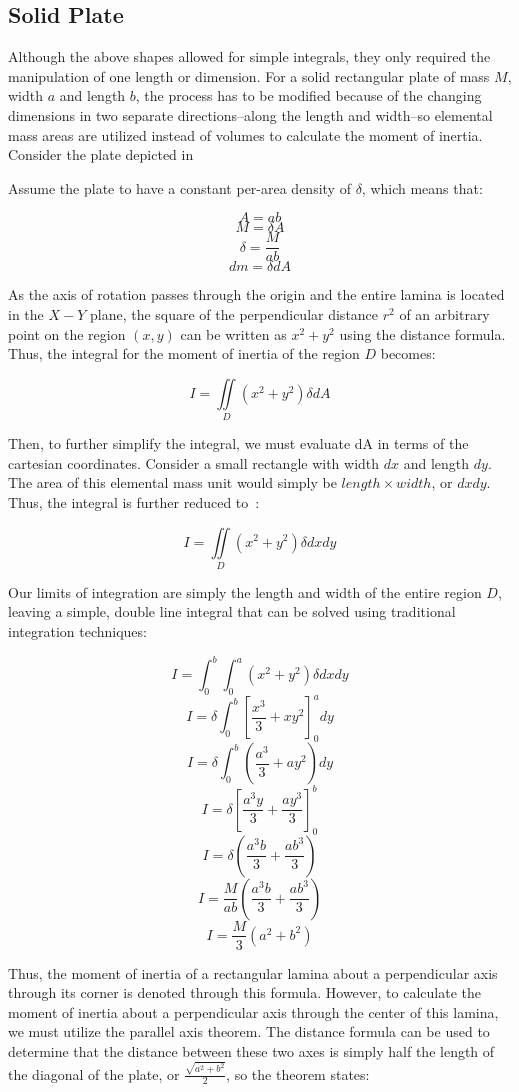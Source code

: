 \subsection{Solid Plate}

Although the above shapes allowed for simple integrals, they only required the manipulation of one length or dimension. For a solid rectangular plate of mass $M$, width $a$ and length $b$, the process has to be modified because of the changing dimensions in two separate directions--along the length and width--so elemental mass areas are utilized instead of volumes to calculate the moment of inertia. Consider the plate depicted in 



Assume the plate to have a constant per-area density of $\delta$, which means that:

\[A = ab\]
\[M = \delta A\]
\[\delta = \frac{M}{ab}\]
\[dm = \delta dA\]


As the axis of rotation passes through the origin and the entire lamina is located in the $X-Y$ plane, the square of the perpendicular distance $r^2$ of an arbitrary point on the region $(x, y)$ can be written as $x^2+y^2$ using the distance formula. Thus, the integral for the moment of inertia of the region $D$ becomes:

\[I = \iint\limits_{D} (x^2+y^2)\delta dA\]

Then, to further simplify the integral, we must evaluate dA in terms of the cartesian coordinates. Consider a small rectangle with width $dx$ and length $dy$. The area of this elemental mass unit would simply be $length \times width$, or $dxdy$. Thus, the integral is further reduced to~\parencite{Hass_Heil_Weir_2018}:

\[I = \iint\limits_{D} (x^2+y^2)\delta dxdy\]

Our limits of integration are simply the length and width of the entire region $D$, leaving a simple, double line integral that can be solved using traditional integration techniques:

\[I = \int_0^b\int_0^a (x^2+y^2)\delta dxdy\]
\[I = \delta\int_0^b\left[\frac{x^3}{3}+xy^2\right]_0^a dy\]
\[I = \delta\int_0^b\left(\frac{a^3}{3}+ay^2\right) dy\]
\[I = \delta\left[\frac{a^3y}{3}+\frac{ay^3}{3}\right]_0^b\]
\[I = \delta\left(\frac{a^3b}{3}+\frac{ab^3}{3}\right)\]
\[I = \frac{M}{ab}\left(\frac{a^3b}{3}+\frac{ab^3}{3}\right)\]
\[I = \frac{M}{3}\left(a^2+b^2\right)\]

Thus, the moment of inertia of a rectangular lamina about a perpendicular axis through its corner is denoted through this formula. However, to calculate the moment of inertia about a perpendicular axis through the center of this lamina, we must utilize the parallel axis theorem. The distance formula can be used to determine that the distance between these two axes is simply half the length of the diagonal of the plate, or $\frac{\sqrt{a^2+b^2}}{2}$, so the theorem states:

